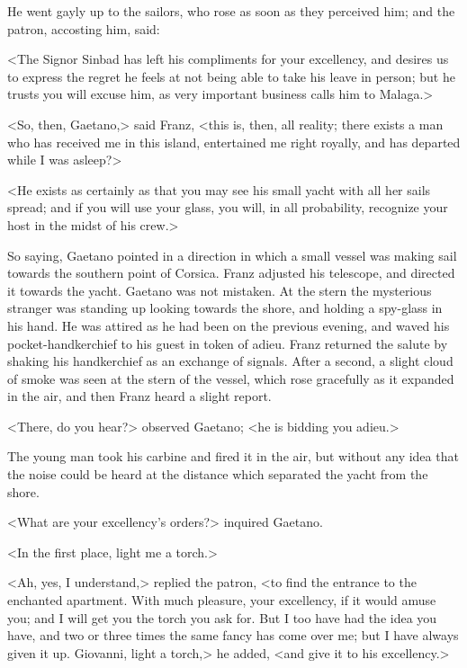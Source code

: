  He went gayly up to the sailors, who rose as soon as they perceived him; and the patron, accosting him, said: 

 <The Signor Sinbad has left his compliments for your excellency, and desires us to express the regret he feels at not being able to take his leave in person; but he trusts you will excuse him, as very important business calls him to Malaga.> 

 <So, then, Gaetano,> said Franz, <this is, then, all reality; there exists a man who has received me in this island, entertained me right royally, and has departed while I was asleep?> 

 <He exists as certainly as that you may see his small yacht with all her sails spread; and if you will use your glass, you will, in all probability, recognize your host in the midst of his crew.> 

 So saying, Gaetano pointed in a direction in which a small vessel was making sail towards the southern point of Corsica. Franz adjusted his telescope, and directed it towards the yacht. Gaetano was not mistaken. At the stern the mysterious stranger was standing up looking towards the shore, and holding a spy-glass in his hand. He was attired as he had been on the previous evening, and waved his pocket-handkerchief to his guest in token of adieu. Franz returned the salute by shaking his handkerchief as an exchange of signals. After a second, a slight cloud of smoke was seen at the stern of the vessel, which rose gracefully as it expanded in the air, and then Franz heard a slight report. 

 <There, do you hear?> observed Gaetano; <he is bidding you adieu.> 

 The young man took his carbine and fired it in the air, but without any idea that the noise could be heard at the distance which separated the yacht from the shore. 

 <What are your excellency's orders?> inquired Gaetano. 

 <In the first place, light me a torch.> 

 <Ah, yes, I understand,> replied the patron, <to find the entrance to the enchanted apartment. With much pleasure, your excellency, if it would amuse you; and I will get you the torch you ask for. But I too have had the idea you have, and two or three times the same fancy has come over me; but I have always given it up. Giovanni, light a torch,> he added, <and give it to his excellency.> 


